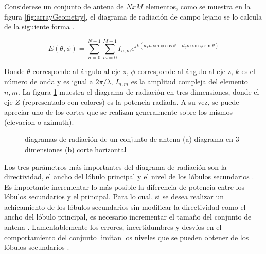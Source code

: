Considerese un conjunto de antena de $NxM$ elementos, como se muestra en la figura \ref{fig:arrayGeometry}, el diagrama de
radiación de campo lejano se lo calcula de la siguiente forma \cite{Mahafza2004}.

\begin{equation}
	E(\theta, \phi) = \sum_{n=0}^{N-1}\sum_{m=0}^{M-1} I_{n,m} e^{jk(d_xn\sin\phi\cos\theta + d_ym\sin\phi\sin\theta)}
\end{equation}

Donde $\theta$ corresponde al ángulo al eje x, $\phi$ corresponde al ángulo al eje z, $k$ es el número de onda y es igual
a $2\pi/\lambda$, $I_{n,m}$ es la amplitud compleja del elemento $n,m$. La figura \ref{fig:arrayPattern} muestra el diagrama de
radiación en tres dimensiones, donde el eje $Z$ (representado con colores) es la potencia radiada. A su vez, se puede apreciar 
uno de los cortes que se realizan generalmente sobre los mismos (elevacion o azimuth).

\begin{figure}[H]
 \centering
	\caption{diagramas de radiación de un conjunto de antena (a) diagrama en 3 dimensiones \cite{arrayPattern} (b) corte horizontal}
 \label{fig:arrayPattern}
\end{figure}

Los tres parámetros más importantes del diagrama de radiación son la directividad, el ancho del lóbulo principal y el nivel
de los lóbulos secundarios \cite{Hsiao1985}. Es importante incrementar lo más posible la diferencia de potencia entre los 
lóbulos secundarios y el principal. Para lo cual, si se desea realizar un achicamiento de los lóbulos secundarios sin modificar 
la directividad como el ancho del lóbulo principal, es necesario incrementar el tamaño del conjunto de antena \cite{Hsiao1985}. 
Lamentablemente los errores, incertidumbres y desvíos en el comportamiento del conjunto limitan los niveles que se pueden 
obtener de los lóbulos secundarios \cite{Hsiao1985}.

